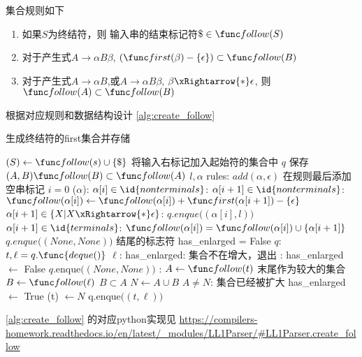 \documentclass[../report]{subfiles}
\begin{document}
\follow 集合规则如下

\begin{enumerate}
  \item 如果$S$为终结符，则 输入串的结束标记符$ \$ \in \follow(S)$
  \item 对于产生式$A \to \alpha B \beta$, $(\first (\beta) - \{\epsilon \}) \subset \follow(B)$
  \item 对于产生式$A \to \alpha B$,或$A \to \alpha B \beta$,
    $\beta \xRightarrow{*} \epsilon$,
    则$\follow (A) \subset \follow(B)$

\end{enumerate}

根据对应规则和数据结构设计
\cref{alg:create_follow}

\begin{algorithm}[H]
  \caption{生成终结符的first集合并存储}
  \begin{codebox}
      \li \follow $(S) \gets \follow (s) \cup \{\$\}$
        \Comment 将输入右标记加入起始符的\follow 集合中
      \li {} $q$
        \Comment 保存$(A,B) \follow(B) \subset \follow(A)$
      \li \For $l,\alpha$  rules:
      \Then
        \li $add(\alpha,\epsilon)$ \Comment 在规则最后添加空串标记
        \li \For $i=0$ \To {}($\alpha$):
        \Then
          \li \If $\alpha[i] \in \id{nonterminals}$:
            \Then
              \li \If $\alpha[i+1] \in \id{nonterminals}$:
              \Then
                \li $\follow(\alpha[i]) \gets \follow(\alpha[i]) + \first(\alpha[i+1]) - \{ \epsilon \}$
              \End
              \li \If $\alpha[i+1] \in \{ X| X \xRightarrow{*} \epsilon \}$:
              \Then
                \li $q.enque\big((\alpha[i],l)\big)$
                \li \Else \If $\alpha[i+1] \in \id{terminals}$:
                \li $\follow(\alpha[i]) =  \follow(\alpha[i]) \cup \{\alpha[i+1]\}$
              \End
            \End
        \End
        \li $q.enque\big((None,None)\big)$ \Comment 结尾的标志符
        \li has\_enlarged = False
        \li \While $q$:
        \Then
          \li $t,\ell = q.\func{deque()}$
          \li \If $\ell$:
          \Then
            \li \If {} has\_enlarged:
            \Then
              \li {} \Comment 集合不在增大，退出
            \li \Else:
              \li has\_enlarged $\gets$ False
              \li $q.$enque$\big((None,None)\big)$
            \End
            \Else :
              \li $A \gets \follow(t)$ \Comment 末尾作为较大的集合
              \li $B \gets \follow(\ell)$ \Comment $B \subset A$
              \li $N \gets A \cup B$
              \li \If $A \neq N$: \Comment 集合已经被扩大
              \Then
                \li has\_enlarged $\gets$ True
                \li \follow(t) $\gets N$
              \End
              \li q.enque$\big((t,\ell)\big)$
          \End
        \End
      \End

  \end{codebox}
  \label{alg:create_follow}
\end{algorithm}

\cref{alg:create_follow} 的对应python实现见
\url{https://compilers-homework.readthedocs.io/en/latest/_modules/LL1Parser/#LL1Parser.create_follow}
\end{document}
